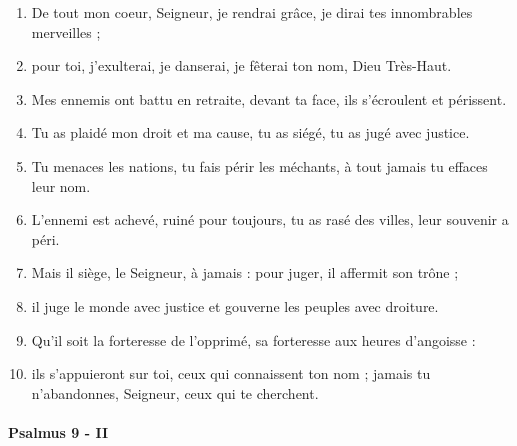 \documentclass[twoside]{article}
\begin{document}
\begin{paracol}[1]{2}
\begin{enumerate}[wide, itemsep=0mm, labelwidth=!, labelindent=0pt, label=\color{gregoriocolor}\theenumi]
\item De tout mon coeur, Seigneur, je rendrai grâce, je dirai tes innombrables merveilles ;
\item pour toi, j'exulterai, je danserai, je fêterai ton nom, Dieu Très-Haut.
\item Mes ennemis ont battu en retraite, devant ta face, ils s'écroulent et périssent.
\item Tu as plaidé mon droit et ma cause, tu as siégé, tu as jugé avec justice.
\item Tu menaces les nations, tu fais périr les méchants, à tout jamais tu effaces leur nom.
\item L'ennemi est achevé, ruiné pour toujours, tu as rasé des villes, leur souvenir a péri.
\item Mais il siège, le Seigneur, à jamais : pour juger, il affermit son trône ;
\item il juge le monde avec justice et gouverne les peuples avec droiture.
\item Qu'il soit la forteresse de l'opprimé, sa forteresse aux heures d'angoisse :
\item ils s'appuieront sur toi, ceux qui connaissent ton nom ; jamais tu n'abandonnes, Seigneur, ceux qui te cherchent.
\end{enumerate}

\switchcolumn*

\paragraph{Psalmus 9 - II}



\end{paracol}
\end{document}
